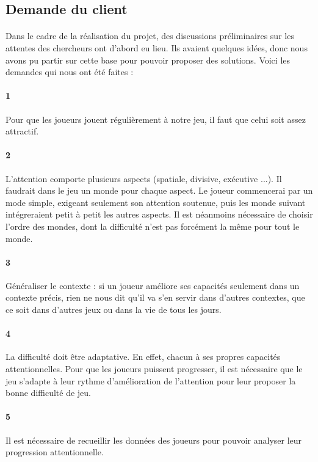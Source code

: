\subsection{Demande du client}

\paragraph{}Dans le cadre de la réalisation du projet, des discussions préliminaires sur les attentes des chercheurs ont d'abord eu lieu. Ils avaient quelques idées, donc nous avons
pu partir sur cette base pour pouvoir proposer des solutions. Voici les demandes qui nous ont été faites :


\paragraph{1}Pour que les joueurs jouent régulièrement à notre jeu, il faut que celui soit assez attractif.
\paragraph{2}L'attention comporte plusieurs aspects (spatiale, divisive, exécutive ...). Il faudrait dans le jeu un monde pour chaque aspect. Le joueur commencerai par un mode simple,
exigeant seulement son attention soutenue, puis les monde suivant intégreraient petit à petit les autres aspects. Il est néanmoins nécessaire de choisir l'ordre des mondes, dont la
difficulté n'est pas forcément la même pour tout le monde.
\paragraph{3}Généraliser le contexte : si un joueur améliore ses capacités seulement dans un contexte précis, rien ne nous dit qu'il va s'en servir dans d'autres contextes, que ce soit
dans d'autres jeux ou dans la vie de tous les jours.
\paragraph{4}La difficulté doit être adaptative. En effet, chacun à ses propres capacités attentionnelles. Pour que les joueurs puissent progresser, il est nécessaire que le jeu
s'adapte à leur rythme d'amélioration de l'attention pour leur proposer la bonne difficulté de jeu.
\paragraph{5}Il est nécessaire de recueillir les données des joueurs pour pouvoir analyser leur progression attentionnelle.
